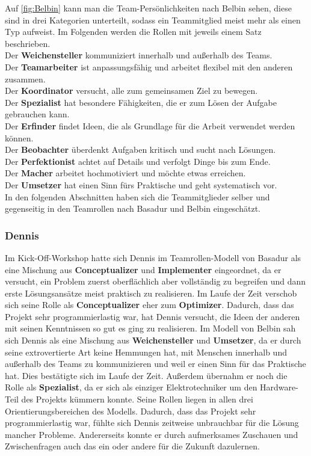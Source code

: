 \documentclass[a4paper,12pt,headsepline]{scrartcl}
\begin{document}
		Auf \cref{fig:Belbin} kann man die Team-Persönlichkeiten nach Belbin sehen, diese sind in drei Kategorien unterteilt, sodass ein Teammitglied meist mehr als einen Typ aufweist. Im Folgenden werden die Rollen mit jeweils einem Satz beschrieben.\\
		Der \textbf{Weichensteller} kommuniziert innerhalb und außerhalb des Teams.\\
		Der \textbf{Teamarbeiter} ist anpassungsfähig und arbeitet flexibel mit den anderen zusammen.\\
		Der \textbf{Koordinator} versucht, alle zum gemeinsamen Ziel zu bewegen.\\
		Der \textbf{Spezialist} hat besondere Fähigkeiten, die er zum Lösen der Aufgabe gebrauchen kann.\\
		Der \textbf{Erfinder} findet Ideen, die als Grundlage für die Arbeit verwendet werden können.\\
		Der \textbf{Beobachter} überdenkt Aufgaben kritisch und sucht nach Lösungen.\\
		Der \textbf{Perfektionist} achtet auf Details und verfolgt Dinge bis zum Ende.\\
		Der \textbf{Macher} arbeitet hochmotiviert und möchte etwas erreichen.\\
		Der \textbf{Umsetzer} hat einen Sinn fürs Praktische und geht systematisch vor.\\
		
		In den folgenden Abschnitten haben sich die Teammitglieder selber und gegenseitig in den Teamrollen nach Basadur und Belbin eingeschätzt.
	\subsubsection{Dennis}
Im Kick-Off-Workshop hatte sich Dennis im Teamrollen-Modell von Basadur als eine Mischung aus \textbf{Conceptualizer} und \textbf{Implementer} eingeordnet, da er versucht, ein Problem zuerst oberflächlich aber vollständig zu begreifen und dann erste Lösungsansätze meist praktisch zu realisieren. Im Laufe der Zeit verschob sich seine Rolle als \textbf{Conceptualizer} eher zum \textbf{Optimizer}. Dadurch, dass das Projekt sehr programmierlastig war, hat Dennis versucht, die Ideen der anderen mit seinen Kenntnissen so gut es ging zu realisieren. Im Modell von Belbin sah sich Dennis als eine Mischung aus \textbf{Weichensteller} und \textbf{Umsetzer}, da er durch seine extrovertierte Art keine Hemmungen hat, mit Menschen innerhalb und außerhalb des Teams zu kommunizieren und weil er einen Sinn für das Praktische hat. Dies bestätigte sich im Laufe der Zeit. Außerdem übernahm er noch die Rolle als \textbf{Spezialist}, da er sich als einziger Elektrotechniker um den Hardware-Teil des Projekts kümmern konnte. Seine Rollen liegen in allen drei Orientierungsbereichen des Modells. Dadurch, dass das Projekt sehr programmierlastig war, fühlte sich Dennis zeitweise unbrauchbar für die Lösung mancher Probleme. Andererseits konnte er durch aufmerksames Zuschauen und Zwischenfragen auch das ein oder andere für die Zukunft dazulernen.
\end{document}

